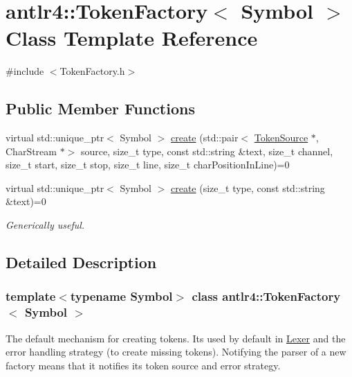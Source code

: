 \hypertarget{classantlr4_1_1TokenFactory}{}\section{antlr4\+:\+:Token\+Factory$<$ Symbol $>$ Class Template Reference}
\label{classantlr4_1_1TokenFactory}


{\ttfamily \#include $<$Token\+Factory.\+h$>$}

\subsection*{Public Member Functions}
\begin{DoxyCompactItemize}
\item 
virtual std\+::unique\+\_\+ptr$<$ Symbol $>$ \hyperlink{classantlr4_1_1TokenFactory_a25efd6b38907e594ddc848887fbd7303}{create} (std\+::pair$<$ \hyperlink{classantlr4_1_1TokenSource}{Token\+Source} $\ast$, Char\+Stream $\ast$$>$ source, size\+\_\+t type, const std\+::string \&text, size\+\_\+t channel, size\+\_\+t start, size\+\_\+t stop, size\+\_\+t line, size\+\_\+t char\+Position\+In\+Line)=0
\item 
\mbox{\label{classantlr4_1_1TokenFactory_a43347835d5d4f2184156ed7427e23a1b}} 
virtual std\+::unique\+\_\+ptr$<$ Symbol $>$ \hyperlink{classantlr4_1_1TokenFactory_a43347835d5d4f2184156ed7427e23a1b}{create} (size\+\_\+t type, const std\+::string \&text)=0
\begin{DoxyCompactList}\small\item\em Generically useful. \end{DoxyCompactList}\end{DoxyCompactItemize}


\subsection{Detailed Description}
\subsubsection*{template$<$typename Symbol$>$\newline
class antlr4\+::\+Token\+Factory$<$ Symbol $>$}

The default mechanism for creating tokens. It\textquotesingle{}s used by default in \hyperlink{classantlr4_1_1Lexer}{Lexer} and the error handling strategy (to create missing tokens). Notifying the parser of a new factory means that it notifies it\textquotesingle{}s token source and error strategy. 

